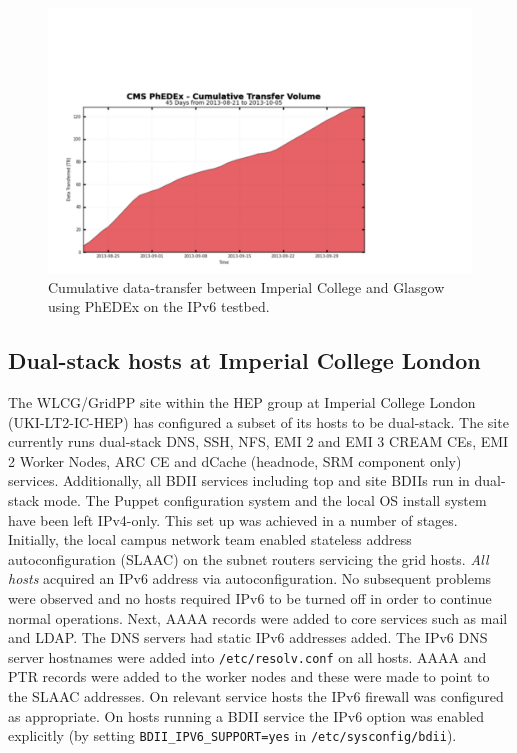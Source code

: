 \begin{figure}[htp]
\centering
\includegraphics{phedex-transfer-volume}
\caption{Cumulative data-transfer between Imperial College and Glasgow using PhEDEx on the IPv6 testbed.}\label{fig:phedex-transfer-volume}
\end{figure}

\subsection{Dual-stack hosts at Imperial College London}
The WLCG/GridPP site within the HEP group at Imperial College London (UKI-LT2-IC-HEP) has configured a subset of its hosts to be dual-stack. 
The site currently runs dual-stack DNS, SSH, NFS, EMI 2 and EMI 3 CREAM CEs, EMI 2 Worker Nodes, 
ARC CE and dCache (headnode, SRM component only) services.
Additionally, all BDII services including top and site BDIIs run in dual-stack mode. The Puppet configuration system and the local OS install system have been left IPv4-only.
This set up was achieved in a number of stages. Initially, the local campus network team enabled 
stateless address autoconfiguration (SLAAC) on the subnet routers servicing the grid hosts. {\em All hosts} acquired an IPv6 address via autoconfiguration. 
No subsequent problems were observed and no hosts required IPv6 to be turned off in order to continue normal operations. 
Next, AAAA records were added to core services such as mail and LDAP. The DNS servers had static IPv6 addresses added. 
The IPv6 DNS server hostnames were added into {\tt /etc/resolv.conf} on all hosts. AAAA and PTR records were added to the worker nodes and these were made to point to the SLAAC addresses. 
On relevant service hosts the IPv6 firewall was configured as appropriate. On hosts running a BDII service the IPv6 option was enabled explicitly 
(by setting {\tt BDII\_IPV6\_SUPPORT=yes} in {\tt /etc/sysconfig/bdii}).
